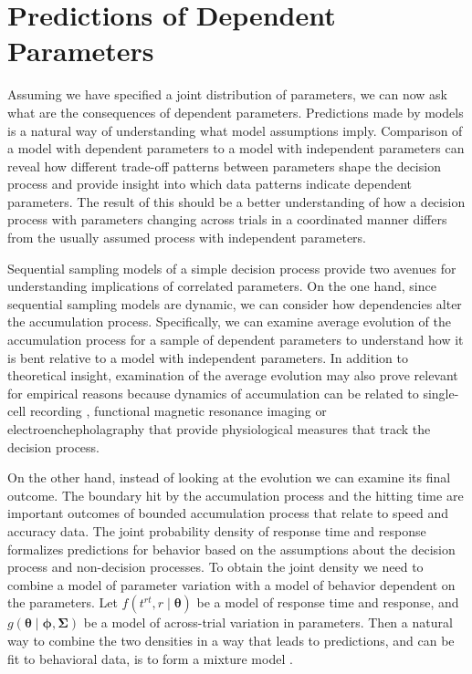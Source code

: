 \documentclass[12pt]{report}
\begin{document}
\section{Predictions of Dependent Parameters}

Assuming we have specified a joint distribution of parameters, we can now ask what are the consequences of dependent parameters. Predictions made by models is a natural way of understanding what model assumptions imply. Comparison of a model with dependent parameters to a model with independent parameters can reveal how different trade-off patterns between parameters shape the decision process and provide insight into which data patterns indicate dependent parameters. The result of this should be a better understanding of how a decision process with parameters changing across trials in a coordinated manner differs from the usually assumed process with independent parameters.

Sequential sampling models of a simple decision process provide two avenues for understanding implications of correlated parameters. On the one hand, since sequential sampling models are dynamic, we can consider how dependencies alter the accumulation process. Specifically, we can examine average evolution of the accumulation process for a sample of dependent parameters to understand how it is bent relative to a model with independent parameters. In addition to theoretical insight, examination of the average evolution may also prove relevant for empirical reasons because dynamics of accumulation can be related to single-cell recording \citep{RatHas2007}, functional magnetic resonance imaging \citep{HarSch2011} or electroenchepholagraphy \citep{PolRaf2014} that provide physiological measures that track the decision process. 

On the other hand, instead of looking at the evolution we can examine its final outcome. The boundary hit by the accumulation process and the hitting time are important outcomes of bounded accumulation process that relate to speed and accuracy data. The joint probability density of response time and response formalizes predictions for behavior based on the assumptions about the decision process and non-decision processes. To obtain the joint density we need to combine a model of parameter variation with a model of behavior dependent on the parameters. Let $f(t^{rt},r \mid \boldsymbol{\theta})$ be a model of response time and response, and $g(\boldsymbol{\theta} \mid \boldsymbol{\phi}, \boldsymbol{\Sigma})$ be a model of across-trial variation in parameters. Then a natural way to combine the two densities in a way that leads to predictions, and can be fit to behavioral data, is to form a mixture model \citep{CasBer2002}. 
\end{document}
